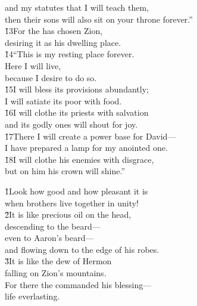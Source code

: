 \begin{poetry}
\poemll    and my statutes that I will teach them, \\
\poemlll       then their sons will also sit on your throne forever.'' \\
\poeml \v{13}For the  has chosen Zion, \\
\poemll    desiring it as his dwelling place. \\
\poeml \v{14}``This is my resting place forever. \\
\poemll    Here I will live, \\
\poemlll       because I desire to do so. \\
\poeml \v{15}I will bless its provisions abundantly; \\
\poemll    I will satiate its poor with food. \\
\poeml \v{16}I will clothe its priests with salvation \\
\poemll    and its godly ones will shout for joy. \\
\poeml \v{17}There I will create a power base for David--- \\
\poemll    I have prepared a lamp for my anointed one. \\
\poeml \v{18}I will clothe his enemies with disgrace, \\
\poemll    but on him his crown will shine.''
\end{poetry}

\begin{poetry}
\poeml \v{1}Look how good and how pleasant it is \\
\poemll    when brothers live together in unity! \\
\poeml \v{2}It is like precious oil on the head, \\
\poemll    descending to the beard--- \\
\poeml even to Aaron's beard--- \\
\poemll    and flowing down to the edge of his robes. \\
\poeml \v{3}It is like the dew of Hermon \\
\poemll    falling on Zion's mountains. \\
\poeml For there the  commanded his blessing--- \\
\poemll    life everlasting.
\end{poetry}

